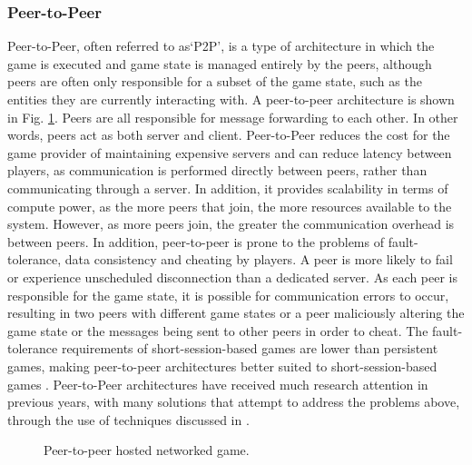 \subsubsection{Peer-to-Peer}
Peer-to-Peer, often referred to as`P2P', is a type of architecture in which the game is executed and game state is managed entirely by the peers, although peers are often only responsible for a subset of the game state, such as the entities they are currently interacting with. A peer-to-peer architecture is shown in Fig. \ref{fig_P2P}. Peers are all responsible for message forwarding to each other. In other words, peers act as both server and client. Peer-to-Peer reduces the cost for the game provider of maintaining expensive servers and can reduce latency between players, as communication is performed directly between peers, rather than communicating through a server. In addition, it provides scalability in terms of compute power, as the more peers that join, the more resources available to the system. However, as more peers join, the greater the communication overhead is between peers. In addition, peer-to-peer is prone to the problems of fault-tolerance, data consistency and cheating by players. A peer is more likely to fail or experience unscheduled disconnection than a dedicated server. As each peer is responsible for the game state, it is possible for communication errors to occur, resulting in two peers with different game states or a peer maliciously altering the game state or the messages being sent to other peers in order to cheat. The fault-tolerance requirements of short-session-based games are lower than persistent games, making peer-to-peer architectures better suited to short-session-based games \cite{P2PForMMOs}. Peer-to-Peer architectures have received much research attention in previous years, with many solutions that attempt to address the problems above, through the use of techniques discussed in \cite{P2PForMMOs}.


\begin{figure}
	\centering
	
	\caption{Peer-to-peer hosted networked game.}
	\label{fig_P2P}
\end{figure}

